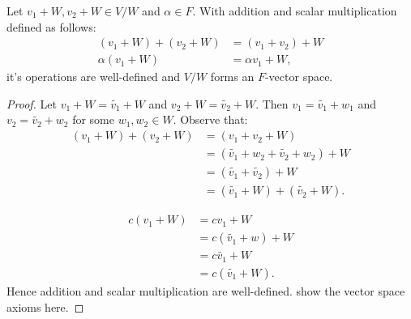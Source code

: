     \begin{proposition}
        Let $v_1 + W, v_2 + W \in V/W$ and $\alpha \in F$. With addition and scalar multiplication defined as follows:
            \begin{equation*}
            \begin{split}
                (v_1 + W) + (v_2 + W) &= (v_1 + v_2) + W\\
                \alpha(v_1 + W) &= \alpha v_1 + W,
            \end{split}
            \end{equation*}
        it's operations are well-defined and $V/W$ forms an $F$-vector space.
    \end{proposition}
        \begin{proof}
            Let $v_1 + W = \tilde{v_1} + W$ and $v_2 + W = \tilde{v_2} + W$. Then $v_1 = \tilde{v_1} + w_1$ and $v_2 = \tilde{v_2} + w_2$ for some $w_1,w_2 \in W$. Observe that:
                \begin{equation*}
                \begin{split}
                    (v_1 + W) + (v_2 + W)
                    & = (v_1 + v_2 + W) \\
                    & = (\tilde{v_1} + w_2 + \tilde{v_2} + w_2) + W \\
                    & = (\tilde{v_1} + \tilde{v_2}) + W \\
                    & = (\tilde{v_1} + W) + (\tilde{v_2} + W).
                \end{split}
                \end{equation*} 

                \begin{equation*}
                \begin{split}
                    c(v_1 + W)
                    & = c v_1 + W \\
                    & = c(\tilde{v_1} + w) + W \\
                    & = c\tilde{v_1} + W \\
                    & = c(\tilde{v_1} + W).
                \end{split}
                \end{equation*}
            Hence addition and scalar multiplication are well-defined. {\color{red} show the vector space axioms here}.
        \end{proof}
    
